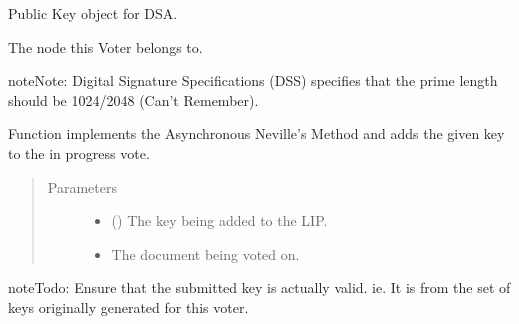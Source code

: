 \documentclass[letterpaper,10pt,english]{sphinxmanual}
\begin{document}
\begin{fulllineitems}
\begin{fulllineitems}
\end{fulllineitems}


\begin{fulllineitems}
\label{\detokenize{index:Voter.Voter.pubKey}}
 \textendash{} Public Key object for DSA.

\end{fulllineitems}


\begin{fulllineitems}
\label{\detokenize{index:Voter.Voter.node}}
 \textendash{} The node this Voter belongs to.

\end{fulllineitems}


\begin{sphinxadmonition}{note}{Note:}
Digital Signature Specifications (DSS) specifies that the prime length should be 1024/2048 (Can’t Remember).
\end{sphinxadmonition}

\begin{fulllineitems}
\label{\detokenize{index:Voter.Voter.add_key_to_signature}}
Function implements the Asynchronous Neville’s Method and adds the given key to the in progress vote.
\begin{quote}\begin{description}
\item[{Parameters}] \leavevmode\begin{itemize}
\item {} 
 (\sphinxstyleliteralemphasis{, }) \textendash{} The key being added to the LIP.

\item {} 
 \textendash{} The document being voted on.

\end{itemize}

\end{description}\end{quote}

\begin{sphinxadmonition}{note}{Todo:}
Ensure that the submitted key is actually valid. ie. It is from the set of keys originally generated
for this voter.
\end{sphinxadmonition}


\end{fulllineitems}
\end{fulllineitems}
\end{document}
